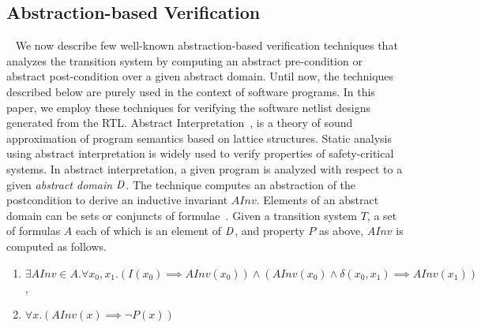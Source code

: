 \subsection{Abstraction-based Verification}~\label{software-verif}
%
We now describe few well-known abstraction-based verification 
techniques that analyzes the transition system by computing an 
abstract pre-condition or abstract post-condition over a given 
abstract domain. Until now, the techniques described below 
are purely used in the context of software programs. In this paper, 
we employ these techniques for verifying the software netlist designs 
generated from the RTL. 
%
Abstract Interpretation~\cite{Cousot92,CC79,DBLP:conf/emsoft/Cousot07},
is a theory of sound approximation of program semantics based on lattice 
structures. Static analysis using abstract interpretation is widely used 
to verify properties of safety-critical systems. 
%
In abstract interpretation, a given program is analyzed 
with respect to a given \textit{abstract domain} $\mathit{D}$.  
The technique computes an abstraction of the postcondition to derive an 
inductive invariant $AInv$.
Elements of an abstract domain can be sets or conjuncts 
of formulae~\cite{DBLP:conf/vmcai/BrainDHGK13}.  
Given a transition system $T$, a set of formulas $A$ each of which is an 
element of $\mathit{D}$, and property $P$ as above, $AInv$ is computed as follows. 
%
\begin{enumerate}
\item  $\exists AInv \in A. \forall x_0, x_1. (I(x_0) \implies AInv(x_0)) 
\wedge (AInv(x_0) \wedge \delta(x_0, x_1) \implies AInv(x_1))$, 
\item $\forall x. (AInv(x) \implies \neg{P(x)})$
\end{enumerate}
%
